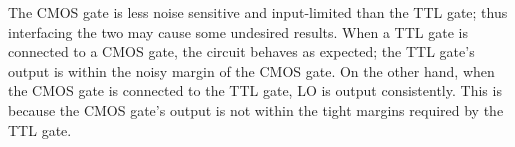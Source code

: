 \documentclass[paper=letter, fontsize=11pt]{scrartcl}
\begin{document}
The CMOS gate is less noise sensitive and input-limited than the TTL gate; thus interfacing the two may cause some undesired results. When a TTL gate is connected to a CMOS gate, the circuit behaves as expected; the TTL gate's output is within the noisy margin of the CMOS gate. On the other hand, when the CMOS gate is connected to the TTL gate, LO is output consistently. This is because the CMOS gate's output is not within the tight margins required by the TTL gate.

\end{document}
